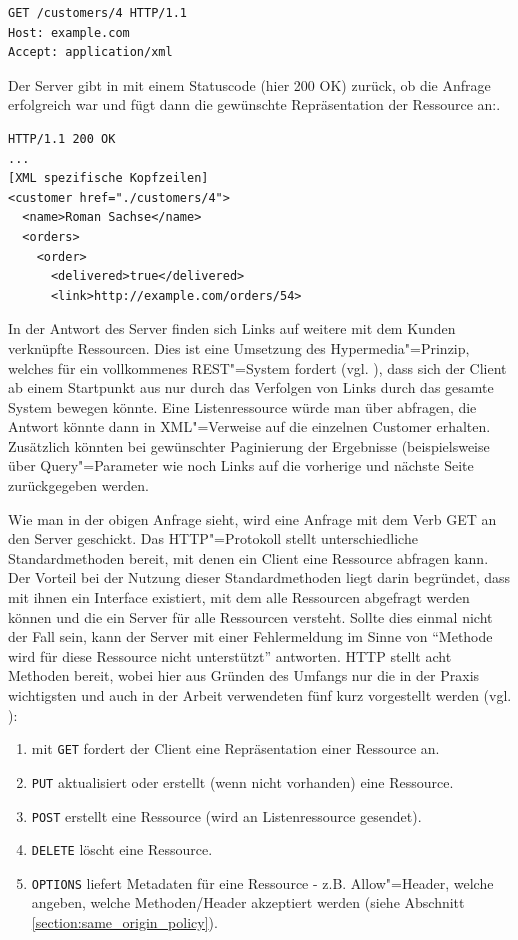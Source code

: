 \begin{lstlisting}
GET /customers/4 HTTP/1.1
Host: example.com
Accept: application/xml 
\end{lstlisting}
Der Server gibt in mit einem Statuscode (hier 200 OK) zurück, ob die Anfrage erfolgreich war und fügt dann die gewünschte Repräsentation der Ressource an:.
\begin{lstlisting}
HTTP/1.1 200 OK
...
[XML spezifische Kopfzeilen]
<customer href="./customers/4">
  <name>Roman Sachse</name>
  <orders>
    <order>
      <delivered>true</delivered>
      <link>http://example.com/orders/54>
\end{lstlisting}
In der Antwort des Server finden sich Links auf weitere mit dem Kunden verknüpfte Ressourcen. Dies ist eine Umsetzung des Hypermedia"=Prinzip, welches für ein vollkommenes \ac{REST}"=System fordert (vgl. \cite{tilkovrest}), dass sich der Client ab einem Startpunkt aus nur durch das Verfolgen von Links durch das gesamte System bewegen könnte. Eine Listenressource würde man über  abfragen, die Antwort könnte dann in \ac{XML}"=Verweise auf die einzelnen Customer erhalten. Zusätzlich könnten bei gewünschter Paginierung der Ergebnisse (beispielsweise über Query"=Parameter wie  noch Links auf die vorherige und nächste Seite zurückgegeben werden.

Wie man in der obigen Anfrage sieht, wird eine Anfrage mit dem Verb GET an den Server geschickt. Das \ac{HTTP}"=Protokoll stellt unterschiedliche Standardmethoden bereit, mit denen ein Client eine Ressource abfragen kann. Der Vorteil bei der Nutzung dieser Standardmethoden liegt darin begründet, dass mit ihnen ein Interface existiert, mit dem alle Ressourcen abgefragt werden können und die ein Server für alle Ressourcen versteht. Sollte dies einmal nicht der Fall sein, kann der Server mit einer Fehlermeldung im Sinne von "`Methode wird für diese Ressource nicht unterstützt"' antworten. \ac{HTTP} stellt acht Methoden bereit, wobei hier aus Gründen des Umfangs nur die in der Praxis wichtigsten und auch in der Arbeit verwendeten fünf kurz vorgestellt werden (vgl. \cite{tilkovrest}):
\begin{enumerate}
 \item mit \texttt{GET} fordert der Client eine Repräsentation einer Ressource an.
 \item \texttt{PUT} aktualisiert oder erstellt (wenn nicht vorhanden) eine Ressource. 
 \item \texttt{POST} erstellt eine Ressource (wird an Listenressource gesendet).
 \item \texttt{DELETE} löscht eine Ressource.
 \item \texttt{OPTIONS} liefert Metadaten für eine Ressource - z.B. Allow"=Header, welche angeben, welche Methoden/Header akzeptiert werden (siehe Abschnitt \ref{section:same_origin_policy}).
\end{enumerate}

